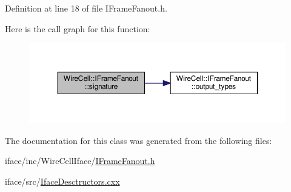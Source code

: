 Definition at line 18 of file I\+Frame\+Fanout.\+h.

Here is the call graph for this function\+:
\nopagebreak
\begin{figure}[H]
\begin{center}
\leavevmode
\includegraphics[width=350pt]{class_wire_cell_1_1_i_frame_fanout_af76c4f0a2dc33b08bcf3cad1d04b82f8_cgraph}
\end{center}
\end{figure}


The documentation for this class was generated from the following files\+:\begin{DoxyCompactItemize}
\item 
iface/inc/\+Wire\+Cell\+Iface/\hyperlink{_i_frame_fanout_8h}{I\+Frame\+Fanout.\+h}\item 
iface/src/\hyperlink{_iface_desctructors_8cxx}{Iface\+Desctructors.\+cxx}\end{DoxyCompactItemize}

